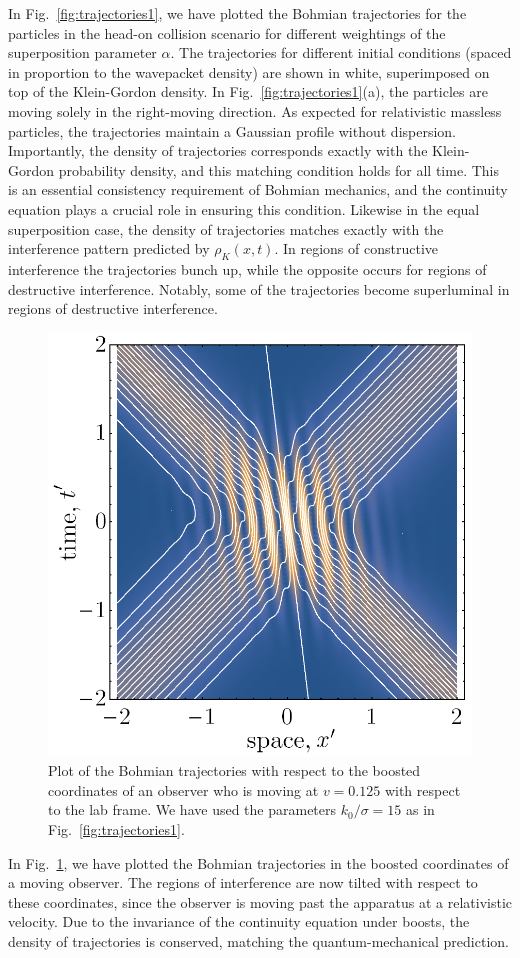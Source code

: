\documentclass[12pt,prx,
,nofootinbib
,floatfix
,superscriptaddress
]{revtex4-2}
\begin{document}
In Fig.\ \ref{fig:trajectories1}, we have plotted the Bohmian trajectories for the particles in the head-on collision scenario for different weightings of the superposition parameter $\alpha$. The trajectories for different initial conditions (spaced in proportion to the wavepacket density) are shown in white, superimposed on top of the Klein-Gordon density. In Fig.\ \ref{fig:trajectories1}(a), the particles are moving solely in the right-moving direction. As expected for relativistic massless particles, the trajectories maintain a Gaussian profile without dispersion. Importantly, the density of trajectories corresponds exactly with the Klein-Gordon probability density, and this matching condition holds for all time. This is an essential consistency requirement of Bohmian mechanics, and the continuity equation plays a crucial role in ensuring this condition. Likewise in the equal superposition case, the density of trajectories matches exactly with the interference pattern predicted by $\rho_K(x,t)$. In regions of constructive interference the trajectories bunch up, while the opposite occurs for regions of destructive interference. Notably, some of the trajectories become superluminal in regions of destructive interference. 

\begin{figure}[htp]
    \centering
    \includegraphics[width=0.6\linewidth]{Fig6boostedsimplified.png}
    \caption{Plot of the Bohmian trajectories with respect to the boosted coordinates of an observer who is moving at $v = 0.125$ with respect to the lab frame. We have used the parameters $k_0/\sigma  = 15$ as in Fig.\ \ref{fig:trajectories1}. }
    \label{fig:trajectoriesboost1}
\end{figure}
In Fig.\ \ref{fig:trajectoriesboost1}, we have plotted the Bohmian trajectories in the boosted coordinates of a moving observer. The regions of interference are now tilted with respect to these coordinates, since the observer is moving past the apparatus at a relativistic velocity. Due to the invariance of the continuity equation under boosts, the density of trajectories is conserved, matching the quantum-mechanical prediction.
\end{document}
